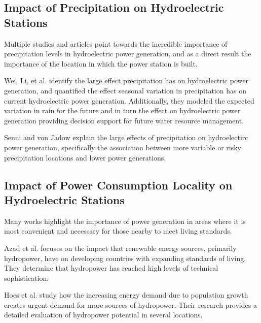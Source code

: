 \documentclass[11pt]{article}
\begin{document}
\subsection{Impact of Precipitation on Hydroelectric Stations}
Multiple studies and articles point towards the incredible importance of precipitation levels in hydroelectric power generation, and as a direct result the importance of the location in which the power station is built. \par
Wei, Li, et al. \cite{frontier2020precipgen} identify the large effect precipitation has on hydroelectric power generation, and quantified the effect seasonal variation in precipitation has on current hydroelectric power generation. Additionally, they modeled the expected variation in rain for the future and in turn the effect on hydroelectric power generation providing decision support for future water resource management. \par
Senni and von Jadow \cite{senni2023risks} explain the large effects of precipitation on hydroelectirc power generation, specifically the association between more variable or risky precipitation locations and lower power generations.
\subsection{Impact of Power Consumption Locality on Hydroelectric Stations}
Many works highlight the importance of power generation in areas where it is most convenient and necessary for those nearby to meet living standards. 
\par Azad et al. \cite{AZAD20202230} focuses on the impact that renewable energy sources, primarily hydropower, have on developing countries with expanding standards of living. They determine that hydropower has reached high levels of technical sophistication.
\par Hoes et al. \cite{10.1371/journal.pone.0171844} study how the increasing energy demand due to population growth creates urgent demand for more sources of hydropower. Their research provides a detailed evaluation of hydropower potential in several locations.
\end{document}
